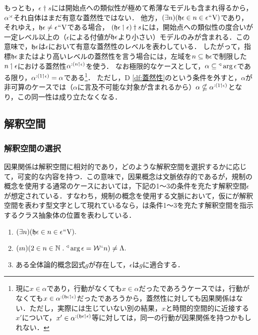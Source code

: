 もっとも，$\epsilon\dagger s$には開始点への類似性が極めて希薄なモデルも含まれ得るから，$\alpha^{:\epsilon}$それ自体はまだ有意な蓋然性ではない．
他方，$(\exists n)(\mathfrak{h}\epsilon\in n\in\epsilon{\mspace{1mu}{``}\mspace{1mu}}\mathrm{V})$であり，それゆえ，$\mathfrak{h}\epsilon \neq \epsilon{\mspace{1mu}{``}\mspace{1mu}}\mathrm{V}$である場合，
$(\mathfrak{h}\epsilon\mathbin{\upharpoonleft}\epsilon)\dagger s$には，開始点への類似性の度合いが一定レベル以上の（$\epsilon$による付値が$\mathfrak{h}\epsilon$より小さい）モデルのみが含まれる．この意味で，$ \mathfrak{h}\epsilon $は$ \epsilon $において有意な蓋然性のレベルを表わしている．
したがって，指標$\mathfrak{h}\epsilon$またはより高いレベルの蓋然性を言う場合には，左域を$n\subseteq\mathfrak{h}\epsilon$で制限した$n\mathbin{\upharpoonleft}\epsilon$における蓋然性$ \alpha^{:(n\mathbin{\upharpoonleft}\epsilon)} $を使う．
なお極限的なケースとして，$ \alpha\subseteq{^\triangleleft}\arg\epsilon $である限り，$ \alpha^{:(1\mathbin{\upharpoonleft}\epsilon)}=\alpha $である\footnote{
    現に$x\in\alpha$であり，行動がなくても$x\in\alpha$だったであろうケースでは，行動がなくても$ x\in\alpha^{:(\mathfrak{h}\epsilon\mathbin{\upharpoonleft}\epsilon)} $だったであろうから，蓋然性に対しても因果関係はない．ただし，実際には生じていない別の結果，$x$と時間的空間的に近接する$x'$について，$x'\in\alpha^{:(\mathfrak{h}\epsilon\mathbin{\upharpoonleft}\epsilon)}$等に対しては，同一の行動が因果関係を持つかもしれない．
}．
ただし，D \ref{df:蓋然性}のという条件を外すと，$\alpha$が非可算のケースでは（$\alpha$に言及不可能な対象が含まれるから）$ \alpha\nsubseteq \alpha^{:(1\mathbin{\upharpoonleft}\epsilon)} $となり，この同一性は成り立たなくなる．


\subsection{解釈空間}
\label{ssec:解釈空間}

\subsubsection{解釈空間の選択}
\label{sssec:解釈空間の選択}

因果関係は解釈空間に相対的であり，どのような解釈空間を選択するかに応じて，可変的な内容を持つ．この意味で，因果概念は文脈依存的であるが，規制の概念を使用する通常のケースにおいては，下記の1〜3の条件を充たす解釈空間$ \epsilon $が想定されている．すなわち，規制の概念を使用する文脈において，仮に\kagi{$ \beta $}が解釈空間を表わす型文字として現れているなら，\kagi{$ \beta $}は条件1〜3を充たす解釈空間を指示するクラス抽象体の位置を表わしている．
\begin{enumerate}
    \item $ (\exists n)(\mathfrak{h}\epsilon\in n \in\epsilon{\mspace{1mu}{``}\mspace{1mu}}\mathrm{V}). $
    \item $ (\imath n)(2\in n\in\mathbb{N}\con{1}\trgl{\arg{\epsilon}}=\mathcal{W}\fap n)\neq\Lambda. $
    \item ある全体論的概念図式$g$が存在して，$\epsilon$は$g$に適合する．
\end{enumerate}

